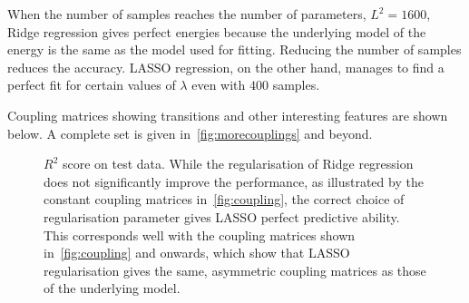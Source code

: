 \documentclass[11pt,british,a4paper]{article}
\numberwithin{equation}{section}
\begin{document}
When the number of samples reaches the number of parameters, \(L^2=\num{1600}\), Ridge regression gives perfect energies because the underlying model of the energy is the same as the model used for fitting. Reducing the number of samples reduces the accuracy. LASSO regression, on the other hand, manages to find a perfect fit for certain values of \(\lambda\) even with \(\num{400}\) samples.

Coupling matrices showing transitions and other interesting features are shown below. A complete set is given in~\vref{fig:morecouplings} and beyond.

\begin{figure}[H]
    \centering
    \caption{\(R^2\) score on test data. While the regularisation of Ridge regression does not significantly improve the performance, as illustrated by the constant coupling matrices in~\vref{fig:coupling}, the correct choice of regularisation parameter gives LASSO perfect predictive ability. This corresponds well with the coupling matrices shown in~\ref{fig:coupling} and onwards, which show that LASSO regularisation gives the same, asymmetric coupling matrices as those of the underlying model.}\label{fig:r2}
\end{figure}
\end{document}
